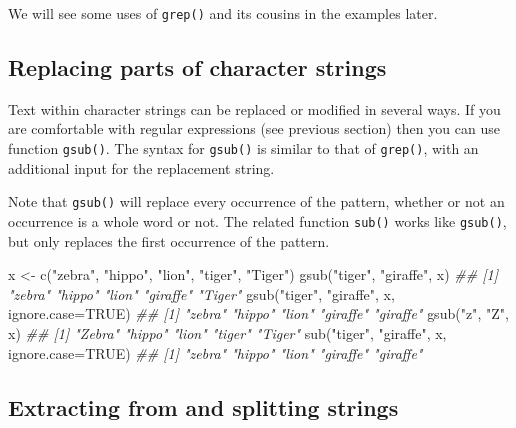 \documentclass[
  13,
  letterpaper,
]{report}
\newenvironment{Shaded}{\begin{snugshade}}{\end{snugshade}}
\newcommand{\AttributeTok}[1]{\textcolor[rgb]{0.40,0.45,0.13}{#1}}
\newcommand{\ConstantTok}[1]{\textcolor[rgb]{0.56,0.35,0.01}{#1}}
\newcommand{\DocumentationTok}[1]{\textcolor[rgb]{0.37,0.37,0.37}{\textit{#1}}}
\newcommand{\FunctionTok}[1]{\textcolor[rgb]{0.28,0.35,0.67}{#1}}
\newcommand{\NormalTok}[1]{\textcolor[rgb]{0.00,0.23,0.31}{#1}}
\newcommand{\OtherTok}[1]{\textcolor[rgb]{0.00,0.23,0.31}{#1}}
\newcommand{\StringTok}[1]{\textcolor[rgb]{0.13,0.47,0.30}{#1}}
\begin{document}
We will see some uses of \texttt{grep()} and its cousins in the examples
later.

\subsection{Replacing parts of character
strings}\label{sec-manip-char-replace}

Text within character strings can be replaced or modified in several
ways. If you are comfortable with regular expressions (see previous
section) then you can use function \texttt{gsub()}. The syntax for
\texttt{gsub()} is similar to that of \texttt{grep()}, with an
additional input for the replacement string.

Note that \texttt{gsub()} will replace every occurrence of the pattern,
whether or not an occurrence is a whole word or not. The related
function \texttt{sub()} works like \texttt{gsub()}, but only replaces
the first occurrence of the pattern.

\begin{Shaded}
\begin{Highlighting}[]
\NormalTok{x }\OtherTok{\textless{}{-}} \FunctionTok{c}\NormalTok{(}\StringTok{"zebra"}\NormalTok{, }\StringTok{"hippo"}\NormalTok{, }\StringTok{"lion"}\NormalTok{, }\StringTok{"tiger"}\NormalTok{, }\StringTok{"Tiger"}\NormalTok{)}
\FunctionTok{gsub}\NormalTok{(}\StringTok{"tiger"}\NormalTok{, }\StringTok{"giraffe"}\NormalTok{, x)}
\DocumentationTok{\#\# [1] "zebra"   "hippo"   "lion"    "giraffe" "Tiger"}
\FunctionTok{gsub}\NormalTok{(}\StringTok{"tiger"}\NormalTok{, }\StringTok{"giraffe"}\NormalTok{, x, }\AttributeTok{ignore.case=}\ConstantTok{TRUE}\NormalTok{)}
\DocumentationTok{\#\# [1] "zebra"   "hippo"   "lion"    "giraffe" "giraffe"}
\FunctionTok{gsub}\NormalTok{(}\StringTok{"z"}\NormalTok{, }\StringTok{"Z"}\NormalTok{, x)}
\DocumentationTok{\#\# [1] "Zebra" "hippo" "lion"  "tiger" "Tiger"}
\FunctionTok{sub}\NormalTok{(}\StringTok{"tiger"}\NormalTok{, }\StringTok{"giraffe"}\NormalTok{, x, }\AttributeTok{ignore.case=}\ConstantTok{TRUE}\NormalTok{)}
\DocumentationTok{\#\# [1] "zebra"   "hippo"   "lion"    "giraffe" "giraffe"}
\end{Highlighting}
\end{Shaded}

\subsection{Extracting from and splitting
strings}\label{sec-manip-char-split}
\end{document}

